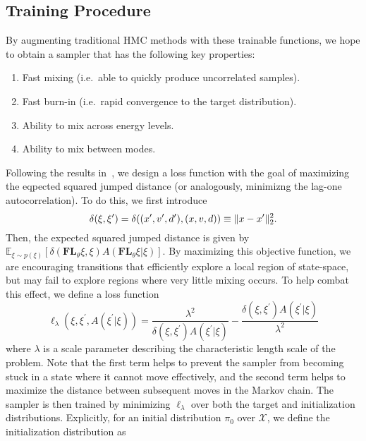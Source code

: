 \documentclass[../main.tex]{subfiles}
\begin{document}
\subsection{Training Procedure}
%
By augmenting traditional HMC methods with these trainable functions, we hope to obtain a sampler that has the
following key properties:
%
\begin{enumerate}
    \item Fast mixing (i.e.\ able to quickly produce uncorrelated samples).
    \item Fast burn-in (i.e.\ rapid convergence to the target distribution).
    \item Ability to mix across energy levels.
    \item Ability to mix between modes.
\end{enumerate}
%
Following the results in~\cite{10.2307/24308995}, we design a loss function with the goal of maximizing the eqpected
squared jumped distance (or analogously, minimizng the lag-one autocorrelation).
%
To do this, we first introduce 
\begin{equation}
  \delta(\xi, {\xi^{\prime}}) = \delta((x^{\prime}, v^{\prime}, d^{\prime}), (x, v, d)) \equiv \| x - x^{\prime}\|^2_2.
  \label{eq:metric_orig}
\end{equation}
%
Then, the expected squared jumped distance is given by $\mathbb{E}_{\xi\sim p(\xi)}
\left[\delta(\mathbf{FL}_{\theta}\xi, \xi) A(\mathbf{FL}_{\theta}\xi | \xi)\right]$.
%
By maximizing this objective function, we are encouraging transitions that efficiently explore a local region of
state-space, but may fail to explore regions where very little mixing occurs.
%
To help combat this effect, we define a loss function
%
\begin{equation}
    \ell_{\lambda}(\xi, \xi^{\prime}, A(\xi^{\prime}|\xi)) =
        \frac{\lambda^2}{\delta(\xi,\xi^{\prime}) A(\xi^{\prime}|\xi)} -
        \frac{\delta(\xi,\xi^{\prime}) A(\xi^{\prime}|\xi)}{\lambda^2}
    \label{eq:loss_ell}
\end{equation}
%
where $\lambda$ is a scale parameter describing the characteristic length scale of the problem.
%
Note that the first term helps to prevent the sampler from becoming stuck in a state where it cannot move effectively,
and the second term helps to maximize the distance between subsequent moves in the Markov chain.  The sampler is then
trained by minimizing $\ell_{\lambda}$ over both the target and initialization distributions.
%
Explicitly, for an initial distribution $\pi_0$ over $\mathcal{X}$, we define the initialization distribution as
\end{document}
